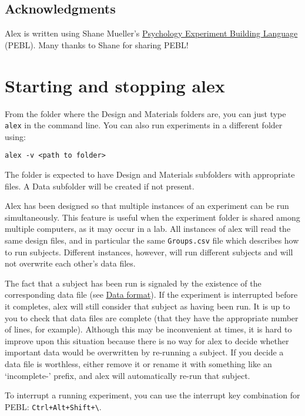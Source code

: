 \documentclass[11pt,]{article}
\begin{document}
\subsection{Acknowledgments}\label{acknowledgements}

Alex is written using Shane Mueller's
\href{http://pebl.sourceforge.net}{Psychology Experiment Building
Language} (PEBL). Many thanks to Shane for sharing PEBL!

\section{Starting and stopping alex}\label{running}

From the folder where the Design and Materials folders are, you can just
type \texttt{alex} in the command line. You can also run experiments in
a different folder using:

\begin{verbatim}
alex -v <path to folder>
\end{verbatim}

The folder is expected to have Design and Materials subfolders with
appropriate files. A Data subfolder will be created if not present.

Alex has been designed so that multiple instances of an experiment can
be run simultaneously. This feature is useful when the experiment folder
is shared among multiple computers, as it may occur in a lab. All
instances of alex will read the same design files, and in particular the
same \texttt{Groups.csv} file which describes how to run subjects.
Different instances, however, will run different subjects and will not
overwrite each other's data files.

The fact that a subject has been run is signaled by the existence of the
corresponding data file (see \hyperref[data-format]{Data format}). If
the experiment is interrupted before it completes, alex will still
consider that subject as having been run. It is up to you to check that
data files are complete (that they have the appropriate number of lines,
for example). Although this may be inconvenient at times, it is hard to
improve upon this situation because there is no way for alex to decide
whether important data would be overwritten by re-running a subject. If
you decide a data file is worthless, either remove it or rename it with
something like an `incomplete-' prefix, and alex will automatically
re-run that subject.

To interrupt a running experiment, you can use the interrupt key
combination for PEBL: \texttt{Ctrl+Alt+Shift+\textbackslash{}}.
\end{document}
